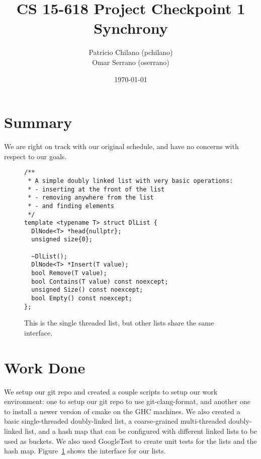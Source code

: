\documentclass[11pt]{article}
\title{\vspace{-25pt}
\huge CS 15-618 Project Checkpoint 1 \\
\huge Synchrony
}
\author{
    Patricio Chilano (pchilano) \\
    Omar Serrano (oserrano)
}
\date{\today}
\begin{document}


\maketitle

\section*{Summary}
We are right on track with our original schedule, and have no concerns with
respect to our goals.

\begin{figure}
\begin{center}
\begin{lstlisting}
/**
 * A simple doubly linked list with very basic operations:
 * - inserting at the front of the list
 * - removing anywhere from the list
 * - and finding elements
 */
template <typename T> struct DlList {
  DlNode<T> *head{nullptr};
  unsigned size{0};

  ~DlList();
  DlNode<T> *Insert(T value);
  bool Remove(T value);
  bool Contains(T value) const noexcept;
  unsigned Size() const noexcept;
  bool Empty() const noexcept;
};
\end{lstlisting}
\caption{
This is the single threaded list, but other lists share the same interface.}
\label{fig:dllist}
\end{center}
\end{figure}

\section*{Work Done}
We setup our git repo and created a couple scripts to setup our work
environment: one to setup our git repo to use git-clang-format, and another one
to install a newer version of cmake on the GHC machines. We also created a basic
single-threaded doubly-linked list, a coarse-grained multi-threaded
doubly-linked list, and a hash map that can be configured with different linked
lists to be used as buckets. We also used GoogleTest to create unit tests for
the lists and the hash map. Figure~\ref{fig:dllist} shows the interface for our
lists.
\end{document}
